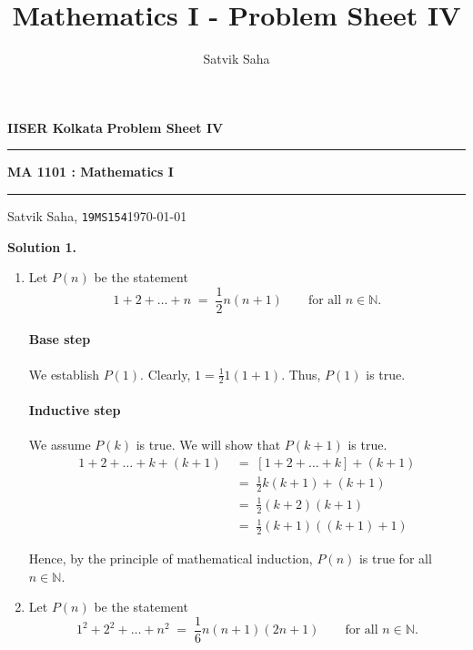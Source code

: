 \documentclass[10pt]{article}
\title{Mathematics I - Problem Sheet IV}
\author{Satvik Saha}
\date{}
\begin{document}
        \par\textbf{IISER Kolkata} \hfill \textbf{Problem Sheet IV}
        \vspace{3pt}
        \hrule
        \vspace{3pt}
        \begin{center}
                \LARGE{\textbf{MA 1101 : Mathematics I}}
        \end{center}
        \vspace{3pt}
        \hrule
        \vspace{3pt}
        Satvik Saha, \texttt{19MS154}\hfill\today
        \vspace{20pt}

        \textbf{Solution 1.}
        \begin{enumerate}
                \item Let $P(n)$ be the statement
                \[1 + 2 + \dots + n \;=\; \frac{1}{2}n(n + 1) \quad\quad\text{for all }n \in \mathbb{N}.\]
                \paragraph{Base step}
                We establish $P(1)$. Clearly, $1 = \frac{1}{2}1(1 + 1)$. Thus, $P(1)$ is true.
                \paragraph{Inductive step}
                We assume $P(k)$ is true. We will show that $P(k + 1)$ is true.
                \begin{align*}
                        1 + 2 + \dots + k + (k + 1)
                                \;&=\; [1 + 2 + \dots + k] + (k + 1) \\
                                \;&=\; \frac{1}{2}k(k + 1) + (k + 1) \tag{From $P(k)$}\\
                                \;&=\; \frac{1}{2}(k + 2)(k + 1) \\
                                \;&=\; \frac{1}{2}(k + 1)((k + 1) + 1)
                \end{align*}

                Hence, by the principle of mathematical induction, $P(n)$ is true for all $n \in \mathbb{N}$.
                
                \item Let $P(n)$ be the statement
                \[1^2 + 2^2 + \dots + n^2 \;=\; \frac{1}{6}n(n + 1)(2n + 1) \quad\quad\text{for all }n \in \mathbb{N}.\]

\end{enumerate}
\end{document}
